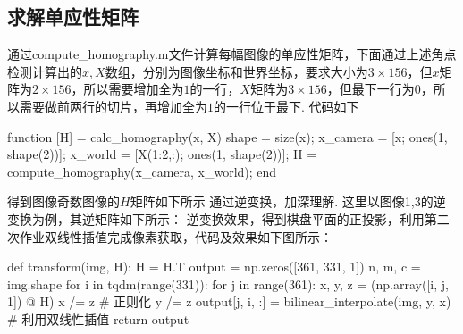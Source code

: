 \documentclass[12pt, a4paper, oneside]{ctexart}
\numberwithin{equation}{section}  %
\begin{document}
\subsection{求解单应性矩阵}
通过compute\_homography.m文件计算每幅图像的单应性矩阵，下面通过上述角点检测计算出的$x,X$数组，分别为图像坐标和世界坐标，要求大小为$3\times 156$，但$x$矩阵为$2\times 156$，所以需要增加全为$1$的一行，$X$矩阵为$3\times 156$，但最下一行为$0$，所以需要做前两行的切片，再增加全为$1$的一行位于最下. 代码如下
\begin{matlabcode}
function [H] = calc_homography(x, X)
    shape = size(x);
    x_camera = [x; ones(1, shape(2))];
    x_world = [X(1:2,:); ones(1, shape(2))];
    H = compute_homography(x_camera, x_world);
end
\end{matlabcode}
得到图像奇数图像的$H$矩阵如下所示
通过逆变换，加深理解. 这里以图像1,3的逆变换为例，其逆矩阵如下所示：
逆变换效果，得到棋盘平面的正投影，利用第二次作业双线性插值完成像素获取，代码及效果如下图所示：
\clearpage
\begin{figure}[htbp]
\end{figure}
\begin{pythoncode}
def transform(img, H):
H = H.T
output = np.zeros([361, 331, 1])
n, m, c = img.shape
for i in tqdm(range(331)):
    for j in range(361):
        x, y, z = (np.array([i, j, 1]) @ H)
        x /= z  # 正则化
        y /= z
        output[j, i, :] = bilinear_interpolate(img, y, x)  # 利用双线性插值
return output
\end{pythoncode}
\end{document}
